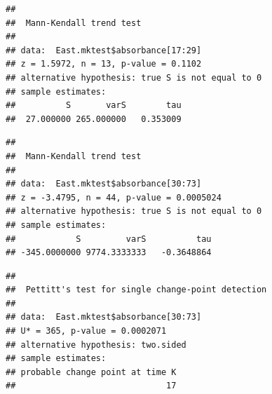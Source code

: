 \documentclass[12pt,]{article}
\newenvironment{Shaded}{\begin{snugshade}}{\end{snugshade}}
\newcommand{\KeywordTok}[1]{\textcolor[rgb]{0.13,0.29,0.53}{\textbf{#1}}}
\newcommand{\DecValTok}[1]{\textcolor[rgb]{0.00,0.00,0.81}{#1}}
\newcommand{\CommentTok}[1]{\textcolor[rgb]{0.56,0.35,0.01}{\textit{#1}}}
\newcommand{\OperatorTok}[1]{\textcolor[rgb]{0.81,0.36,0.00}{\textbf{#1}}}
\newcommand{\NormalTok}[1]{#1}
\begin{document}
\begin{verbatim}
## 
##  Mann-Kendall trend test
## 
## data:  East.mktest$absorbance[17:29]
## z = 1.5972, n = 13, p-value = 0.1102
## alternative hypothesis: true S is not equal to 0
## sample estimates:
##          S       varS        tau 
##  27.000000 265.000000   0.353009
\end{verbatim}

\begin{Shaded}
\end{Shaded}

\begin{verbatim}
## 
##  Mann-Kendall trend test
## 
## data:  East.mktest$absorbance[30:73]
## z = -3.4795, n = 44, p-value = 0.0005024
## alternative hypothesis: true S is not equal to 0
## sample estimates:
##            S         varS          tau 
## -345.0000000 9774.3333333   -0.3648864
\end{verbatim}

\begin{Shaded}
\end{Shaded}

\begin{verbatim}
## 
##  Pettitt's test for single change-point detection
## 
## data:  East.mktest$absorbance[30:73]
## U* = 365, p-value = 0.0002071
## alternative hypothesis: two.sided
## sample estimates:
## probable change point at time K 
##                              17
\end{verbatim}

\begin{Shaded}
\end{Shaded}
\end{document}
